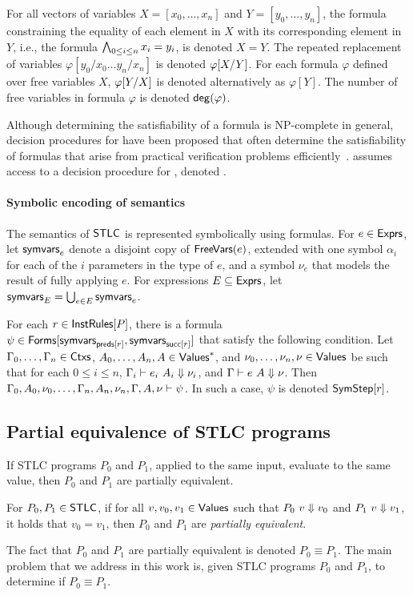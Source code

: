 For all vectors of variables $X = [ x_0, \ldots, x_n ]$ and $Y = [
y_0, \ldots, y_n ]$, the \lia formula constraining the equality of
each element in $X$ with its corresponding element in $Y$, i.e., the
formula $\bigland_{0 \leq i \leq n} x_i = y_i$, is denoted $X = Y$.
%
The repeated replacement of variables $\varphi[ y_0 / x_0 \ldots y_{n}
/ x_{n} ]$ is denoted $\replace{\varphi}{Y}{X}$.
%
For each formula $\varphi$ defined over free variables $X$,
$\replace{\varphi}{X}{Y}$ is denoted alternatively as $\varphi[Y]$.
%
The number of free variables in formula $\varphi$ is denoted
$\degreeof(\varphi)$.

Although determining the satisfiability of a \lia formula is
NP-complete in general, decision procedures for \lia have been
proposed that often determine the satisfiability of formulas that
arise from practical verification problems
efficiently~\cite{demoura08}.
%
\sys assumes access to a decision procedure for \lia, denoted \issat.

\paragraph{Symbolic encoding of semantics}
%
The semantics of $\stlc$ is represented symbolically using \lia
formulas.
%
For $e \in \expr$, let $\symvars{e}$ denote a disjoint copy of
$\freevars(e)$, extended with one symbol $\alpha_i$ for each of the
$i$ parameters in the type of $e$, and a symbol $\nu_e$ that
models the result of fully applying $e$. 
%
For expressions $E \subseteq \expr$, let $\symvars{E} = \bigunion_{e
  \in E} \symvars{e}$.

For each $r \in \instrules{ P }$, there is a formula $\psi \in
\formulas{ \symvars{ \rulepreds{r} }, \symvars{ \rulesucc{r} } }$ that
satisfy the following condition.
%
Let $\Gamma_0, \ldots, \Gamma_n \in \ctxs$, $A_0, \ldots, A_n, A \in
\values^{*}$, and $\nu_0, \ldots, \nu_n, \nu \in \values$ be such that
for each $0 \leq i \leq n$, $\Gamma_i \judges e_i\ A_i \evalsto
\nu_i$, and $\Gamma \judges e\ A \evalsto \nu$.
%
Then $\Gamma_0, A_0, \nu_0, \ldots, \Gamma_n, A_n, \nu_n, \Gamma, A,
\nu \sats \psi$.
%
In such a case, $\psi$ is denoted $\symstep{ r }$.

\subsection{Partial equivalence of STLC programs}
\label{sec:peq}
%
If STLC programs $P_0$ and $P_1$, applied to the same input, evaluate
to the same value, then $P_0$ and $P_1$ are partially equivalent.
%
\begin{defn}
  \label{defn:peq}
  For $P_0, P_1 \in \stlc$, if for all $v, v_0, v_1 \in \values$ such
  that $P_0\ v \evalsto v_0$ and $P_1\ v \evalsto v_1$, it holds that
  $v_0 = v_1$, then $P_0$ and $P_1$ are \emph{partially equivalent}.
\end{defn}
%
The fact that $P_0$ and $P_1$ are partially equivalent is denoted $P_0
\equiv P_1$.
%
The main problem that we address in this work is, given STLC programs
$P_0$ and $P_1$, to determine if $P_0 \equiv P_1$.

